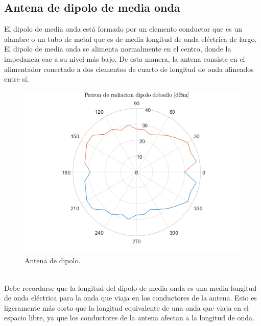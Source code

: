 \documentclass[12pt,letterpaper]{article}
\begin{document}
\subsection{Antena de dipolo de media onda}
El dipolo de media onda está formado por un elemento conductor que es un alambre o un tubo de 
metal que es de media longitud de onda eléctrica de largo. El dipolo de media onda se 
alimenta normalmente en el centro, donde la impedancia cae a su nivel más bajo. De esta 
manera, la antena consiste en el alimentador conectado a dos elementos de cuarto de 
longitud de onda alineados entre sí.
\\
\begin{figure}[ht]
    \centering
    \includegraphics[width=.4\textwidth]{f3.png}
    \caption{Antena de dipolo.}
\end{figure}
\\
Debe recordarse que la longitud del dipolo de media onda es una media longitud de onda 
eléctrica para la onda que viaja en los conductores de la antena. Esto es ligeramente 
más corto que la longitud equivalente de una onda que viaja en el espacio libre, ya que 
los conductores de la antena afectan a la longitud de onda.
\end{document}
